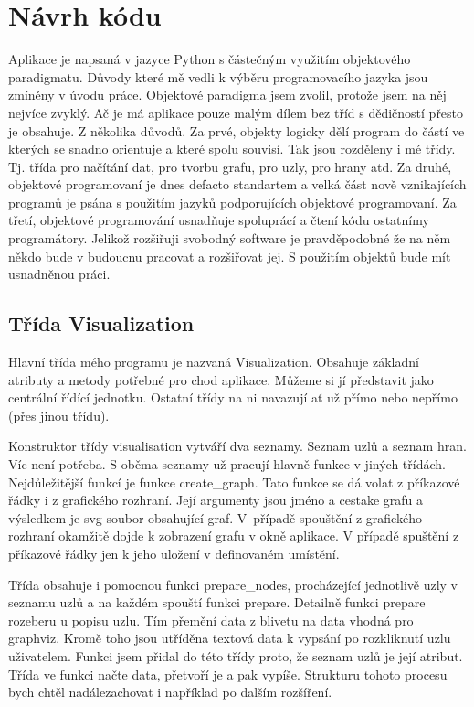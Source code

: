 \documentclass[color,table,oneside,nolot,nolof]{fithesis}
\begin{document}
\section{Návrh kódu}
	Aplikace je napsaná v jazyce Python s částečným využitím objektového paradigmatu. Důvody které mě vedli k výběru programovacího jazyka jsou zmíněny v úvodu práce. Objektové 
	paradigma jsem zvolil, protože jsem na něj nejvíce zvyklý. Ač je má aplikace pouze malým dílem bez tříd s dědičností přesto je obsahuje. Z několika důvodů. Za prvé, objekty logicky
	dělí program do částí ve kterých se snadno orientuje a které spolu souvisí. Tak jsou rozděleny i mé třídy. Tj. třída pro načítání dat, pro tvorbu grafu, pro uzly, pro hrany atd.
	Za druhé, objektové programovaní je dnes defacto standartem a velká část nově vznikajících programů je psána s použitím jazyků podporujících objektové programovaní. Za třetí,
	objektové programování usnadňuje spoluprácí a čtení kódu ostatnímy programátory. Jelikož rozšiřuji svobodný software je pravděpodobné že na něm někdo bude v budoucnu pracovat
	a rozšiřovat jej. S použitím objektů bude mít usnadněnou práci.
	
\subsection{Třída Visualization}
	Hlavní třída mého programu je nazvaná Visualization. Obsahuje základní atributy a metody potřebné pro chod aplikace. Můžeme si jí představit jako centrální řídící jednotku. Ostatní
	třídy na ni navazují ať už přímo nebo nepřímo (přes jinou třídu). 

	Konstruktor třídy visualisation vytváří dva seznamy. Seznam uzlů a seznam hran. Víc není potřeba. S oběma seznamy už pracují hlavně funkce v jiných třídách. Nejdůležitější funkcí
	je funkce create\_graph. Tato funkce se dá volat z příkazové řádky i z grafického rozhraní. Její argumenty jsou jméno a cestake grafu a výsledkem je svg soubor obsahující graf. 
	V~případě spouštění z grafického rozhraní okamžitě dojde k zobrazení grafu v okně aplikace. V případě spuštění z příkazové řádky jen k jeho uložení v definovaném umístění. 

	Třída obsahuje i pomocnou funkci prepare\_nodes, procházející jednotlivě uzly v seznamu uzlů a na každém spouští funkci prepare. Detailně funkci prepare rozeberu u popisu uzlu. Tím
	přemění data z blivetu na data vhodná pro graphviz. Kromě toho jsou utříděna textová data k vypsání po rozkliknutí uzlu uživatelem. Funkci jsem přidal do této třídy proto, že 
	seznam uzlů je její atribut. Třída ve funkci načte data, přetvoří je a pak vypíše. Strukturu tohoto procesu bych chtěl nadálezachovat i například po dalším rozšíření.  
\end{document}
